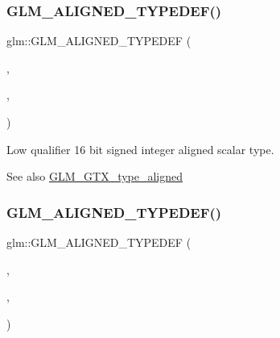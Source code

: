 \subsubsection{\texorpdfstring{G\+L\+M\+\_\+\+A\+L\+I\+G\+N\+E\+D\+\_\+\+T\+Y\+P\+E\+D\+E\+F()}{GLM\_ALIGNED\_TYPEDEF()}\hspace{0.1cm}{\footnotesize\ttfamily [6/209]}}
{\footnotesize\ttfamily glm\+::\+G\+L\+M\+\_\+\+A\+L\+I\+G\+N\+E\+D\+\_\+\+T\+Y\+P\+E\+D\+EF (\begin{DoxyParamCaption}\item[{\mbox{\hyperlink{group__gtc__type__precision_gae34c3d53c4c1434fc9f26538b0185667}{lowp\+\_\+int16\+\_\+t}}}]{,  }\item[{aligned\+\_\+lowp\+\_\+int16\+\_\+t}]{,  }\item[{2}]{ }\end{DoxyParamCaption})}

Low qualifier 16 bit signed integer aligned scalar type. \begin{DoxySeeAlso}{See also}
\mbox{\hyperlink{group__gtx__type__aligned}{G\+L\+M\+\_\+\+G\+T\+X\+\_\+type\+\_\+aligned}} 
\end{DoxySeeAlso}
\mbox{\label{group__gtx__type__aligned_ga8130ea381d76a2cc34a93ccbb6cf487d}} 
\subsubsection{\texorpdfstring{G\+L\+M\+\_\+\+A\+L\+I\+G\+N\+E\+D\+\_\+\+T\+Y\+P\+E\+D\+E\+F()}{GLM\_ALIGNED\_TYPEDEF()}\hspace{0.1cm}{\footnotesize\ttfamily [7/209]}}
{\footnotesize\ttfamily glm\+::\+G\+L\+M\+\_\+\+A\+L\+I\+G\+N\+E\+D\+\_\+\+T\+Y\+P\+E\+D\+EF (\begin{DoxyParamCaption}\item[{\mbox{\hyperlink{group__gtc__type__precision_gad9567c806dc39f534174eef42663119d}{lowp\+\_\+int32\+\_\+t}}}]{,  }\item[{aligned\+\_\+lowp\+\_\+int32\+\_\+t}]{,  }\item[{4}]{ }\end{DoxyParamCaption})}

